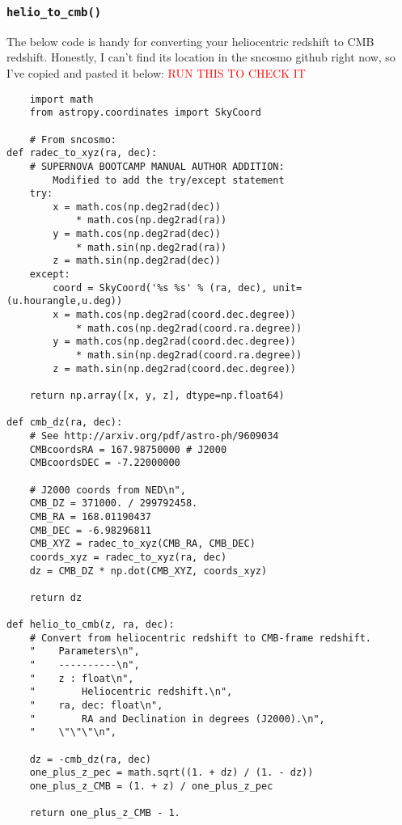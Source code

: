 \subsubsection{\texttt{helio\_to\_cmb()}}
\label{sec:heliotocmb}
The below code is handy for converting your heliocentric redshift to CMB redshift. Honestly, I can't find its location in the sncosmo github right now, so I've copied and pasted it below: \textcolor{red}{RUN THIS TO CHECK IT}
\begin{verbatim}
    import math
    from astropy.coordinates import SkyCoord
    
    # From sncosmo:
def radec_to_xyz(ra, dec):
    # SUPERNOVA BOOTCAMP MANUAL AUTHOR ADDITION: 
        Modified to add the try/except statement
    try:
        x = math.cos(np.deg2rad(dec)) 
            * math.cos(np.deg2rad(ra))
        y = math.cos(np.deg2rad(dec)) 
            * math.sin(np.deg2rad(ra))
        z = math.sin(np.deg2rad(dec))
    except:
        coord = SkyCoord('%s %s' % (ra, dec), unit=(u.hourangle,u.deg))
        x = math.cos(np.deg2rad(coord.dec.degree)) 
            * math.cos(np.deg2rad(coord.ra.degree))
        y = math.cos(np.deg2rad(coord.dec.degree)) 
            * math.sin(np.deg2rad(coord.ra.degree))
        z = math.sin(np.deg2rad(coord.dec.degree))

    return np.array([x, y, z], dtype=np.float64)

def cmb_dz(ra, dec):
    # See http://arxiv.org/pdf/astro-ph/9609034
    CMBcoordsRA = 167.98750000 # J2000 
    CMBcoordsDEC = -7.22000000

    # J2000 coords from NED\n",
    CMB_DZ = 371000. / 299792458.
    CMB_RA = 168.01190437
    CMB_DEC = -6.98296811
    CMB_XYZ = radec_to_xyz(CMB_RA, CMB_DEC)
    coords_xyz = radec_to_xyz(ra, dec)
    dz = CMB_DZ * np.dot(CMB_XYZ, coords_xyz)

    return dz

def helio_to_cmb(z, ra, dec):
    # Convert from heliocentric redshift to CMB-frame redshift.
    "    Parameters\n",
    "    ----------\n",
    "    z : float\n",
    "        Heliocentric redshift.\n",
    "    ra, dec: float\n",
    "        RA and Declination in degrees (J2000).\n",
    "    \"\"\"\n",

    dz = -cmb_dz(ra, dec)
    one_plus_z_pec = math.sqrt((1. + dz) / (1. - dz))
    one_plus_z_CMB = (1. + z) / one_plus_z_pec

    return one_plus_z_CMB - 1.
\end{verbatim}

